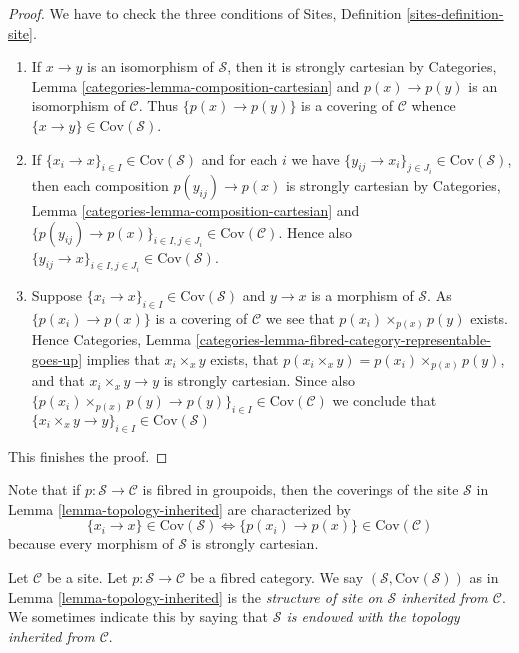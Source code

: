 \begin{proof}
We have to check the three conditions of
Sites, Definition \ref{sites-definition-site}.
\begin{enumerate}
\item If $x \to y$ is an isomorphism of $\mathcal{S}$, then
it is strongly cartesian by
Categories, Lemma \ref{categories-lemma-composition-cartesian}
and $p(x) \to p(y)$ is an isomorphism of $\mathcal{C}$. Thus
$\{p(x) \to p(y)\}$ is a covering of $\mathcal{C}$ whence
$\{x \to y\} \in \text{Cov}(\mathcal{S})$.
\item If $\{x_i \to x\}_{i\in I} \in \text{Cov}(\mathcal{S})$ and for each
$i$ we have $\{y_{ij} \to x_i\}_{j\in J_i} \in \text{Cov}(\mathcal{S})$, then
each composition $p(y_{ij}) \to p(x)$ is strongly cartesian by
Categories, Lemma \ref{categories-lemma-composition-cartesian}
and $\{p(y_{ij}) \to p(x)\}_{i \in I, j\in J_i} \in \text{Cov}(\mathcal{C})$.
Hence also $\{y_{ij} \to x\}_{i \in I, j\in J_i} \in \text{Cov}(\mathcal{S})$.
\item Suppose $\{x_i \to x\}_{i\in I}\in \text{Cov}(\mathcal{S})$
and $y \to x$ is a morphism of $\mathcal{S}$. As $\{p(x_i) \to p(x)\}$
is a covering of $\mathcal{C}$ we see that $p(x_i) \times_{p(x)} p(y)$
exists. Hence
Categories, Lemma \ref{categories-lemma-fibred-category-representable-goes-up}
implies that $x_i \times_x y$ exists, that $p(x_i \times_x y) =
p(x_i) \times_{p(x)} p(y)$, and that $x_i \times_x y \to y$ is
strongly cartesian. Since also
$\{p(x_i) \times_{p(x)} p(y) \to p(y) \}_{i\in I} \in \text{Cov}(\mathcal{C})$
we conclude that
$\{x_i \times_x y \to y \}_{i\in I} \in \text{Cov}(\mathcal{S})$
\end{enumerate}
This finishes the proof.
\end{proof}

\noindent
Note that if $p : \mathcal{S} \to \mathcal{C}$ is fibred in groupoids, then
the coverings of the site $\mathcal{S}$ in
Lemma \ref{lemma-topology-inherited}
are characterized by
$$
\{x_i \to x\} \in \text{Cov}(\mathcal{S})
\Leftrightarrow
\{p(x_i) \to p(x)\} \in \text{Cov}(\mathcal{C})
$$
because every morphism of $\mathcal{S}$ is strongly cartesian.

\begin{definition}
\label{definition-topology-inherited}
Let $\mathcal{C}$ be a site. Let $p : \mathcal{S} \to \mathcal{C}$ be a
fibred category. We say $(\mathcal{S}, \text{Cov}(\mathcal{S}))$ as in
Lemma \ref{lemma-topology-inherited}
is the {\it structure of site on $\mathcal{S}$ inherited from $\mathcal{C}$}.
We sometimes indicate this by saying that
{\it $\mathcal{S}$ is endowed with the topology inherited from $\mathcal{C}$}.
\end{definition}

